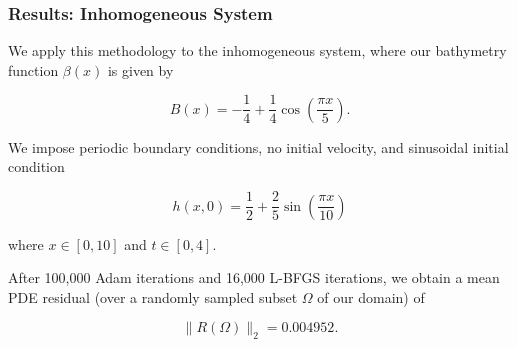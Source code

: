 \begin{frame}
    \frametitle{Results: Inhomogeneous System}

    We apply this methodology to the inhomogeneous system, where our bathymetry function 
    $\beta(x)$ is given by

    $$
    B(x) = -\frac{1}{4} + \frac{1}{4} \cos{\left( \frac{\pi x}{5} \right)}.
    $$
    
    We impose periodic boundary conditions, no initial velocity, and sinusoidal initial condition

    $$
    h(x, 0) = \frac{1}{2} + \frac{2}{5} \sin{\left( \frac{\pi x}{10} \right)}
    $$

    where $x \in [0, 10]$ and $t \in [0, 4]$.

    \medskip
    \pause

    After 100,000 Adam iterations and 16,000 L-BFGS iterations, we obtain a mean PDE residual (over a randomly sampled 
    subset $\Omega$ of our domain) of 
    
    $$
    \lVert R(\Omega) \rVert_2 = 0.004952.
    $$
\end{frame}